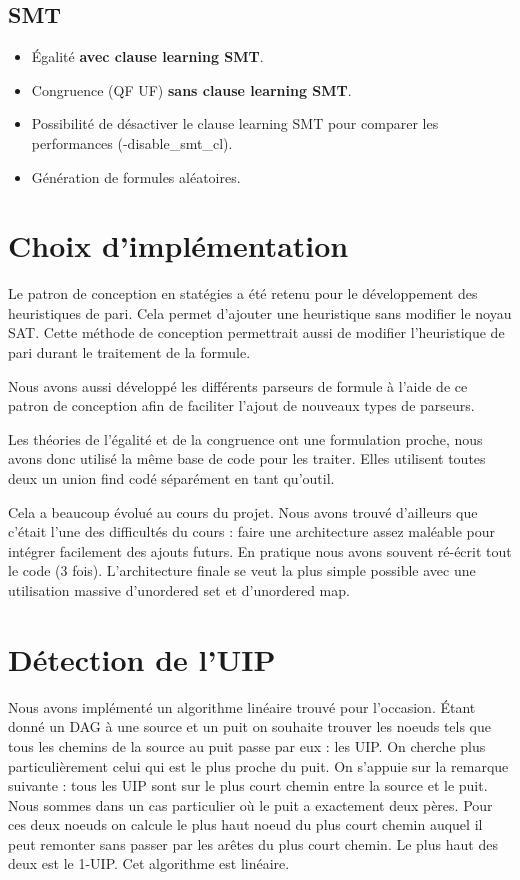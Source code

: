 \documentclass{article}
\begin{document}
\subsection{SMT}
\begin{itemize}
\item Égalité \textbf{avec clause learning SMT}.
\item Congruence (QF UF) \textbf{sans clause learning SMT}.
\item Possibilité de désactiver le clause learning SMT pour comparer les performances (-disable\_smt\_cl).
\item Génération de formules aléatoires.
\end{itemize}

\section{Choix d'implémentation}
Le patron de conception en statégies a été retenu pour le développement des heuristiques de pari. Cela permet d'ajouter une heuristique sans modifier le noyau SAT. 
Cette méthode de conception permettrait aussi de modifier l'heuristique de pari durant le traitement de la formule.

Nous avons aussi développé les différents parseurs de formule à l'aide de ce patron de conception afin de faciliter l'ajout de nouveaux types de parseurs.

Les théories de l'égalité et de la congruence ont une formulation proche, nous avons donc utilisé la même base de code pour les traiter.
Elles utilisent toutes deux un union find codé séparément en tant qu'outil.

Cela a beaucoup évolué au cours du projet. Nous avons trouvé d'ailleurs que c'était l'une des difficultés du cours : faire une architecture assez maléable pour intégrer facilement des ajouts futurs. En pratique nous avons souvent ré-écrit tout le code (3 fois).
L'architecture finale se veut la plus simple possible avec une utilisation massive d'unordered set et d'unordered map.

\section{Détection de l'UIP}
Nous avons implémenté un algorithme linéaire trouvé pour l'occasion. Étant donné un DAG à une source et un puit on souhaite trouver les noeuds tels que tous les chemins de la source au puit passe par eux : les UIP. On cherche plus particulièrement celui qui est le plus proche du puit.
On s'appuie sur la remarque suivante : tous les UIP sont sur le plus court chemin entre la source et le puit. \\
Nous sommes dans un cas particulier où le puit a exactement deux pères. Pour ces deux noeuds on calcule le plus haut noeud du plus court chemin auquel il peut remonter sans passer par les arêtes du plus court chemin. Le plus haut des deux est le 1-UIP. Cet algorithme est linéaire.
\end{document}
